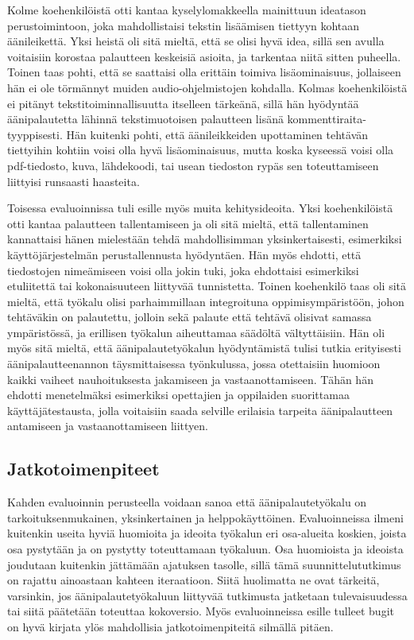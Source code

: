 \documentclass[utf8]{gradu3}
\begin{document}
Kolme koehenkilöistä otti kantaa kyselylomakkeella mainittuun ideatason perustoimintoon, joka mahdollistaisi tekstin lisäämisen tiettyyn kohtaan äänileikettä. Yksi heistä oli sitä mieltä, että se olisi hyvä idea, sillä sen avulla voitaisiin korostaa palautteen keskeisiä asioita, ja tarkentaa niitä sitten puheella. Toinen taas pohti, että se saattaisi olla erittäin toimiva lisäominaisuus, jollaiseen hän ei ole törmännyt muiden audio-ohjelmistojen kohdalla.  Kolmas koehenkilöistä ei pitänyt tekstitoiminnallisuutta itselleen tärkeänä, sillä hän hyödyntää äänipalautetta lähinnä tekstimuotoisen palautteen lisänä kommenttiraita-tyyppisesti. Hän kuitenki pohti, että äänileikkeiden upottaminen tehtävän tiettyihin kohtiin voisi olla hyvä lisäominaisuus, mutta koska kyseessä voisi olla pdf-tiedosto, kuva, lähdekoodi, tai usean tiedoston rypäs sen toteuttamiseen liittyisi runsaasti haasteita.

Toisessa evaluoinnissa tuli esille myös muita kehitysideoita. Yksi koehenkilöistä otti kantaa palautteen tallentamiseen ja oli sitä mieltä, että tallentaminen kannattaisi hänen mielestään tehdä mahdollisimman yksinkertaisesti, esimerkiksi käyttöjärjestelmän perustallennusta hyödyntäen. Hän myös ehdotti, että tiedostojen nimeämiseen voisi olla jokin tuki, joka ehdottaisi esimerkiksi etuliitettä tai kokonaisuuteen liittyvää tunnistetta. Toinen koehenkilö taas oli sitä mieltä, että työkalu olisi parhaimmillaan integroituna oppimisympäristöön, johon tehtäväkin on palautettu, jolloin sekä palaute että tehtävä olisivat samassa ympäristössä, ja erillisen työkalun aiheuttamaa säädöltä vältyttäisiin. Hän oli myös sitä mieltä, että äänipalautetyökalun hyödyntämistä tulisi tutkia erityisesti äänipalautteenannon täysmittaisessa työnkulussa, jossa otettaisiin huomioon kaikki vaiheet nauhoituksesta jakamiseen ja vastaanottamiseen. Tähän hän ehdotti menetelmäksi esimerkiksi opettajien ja oppilaiden suorittamaa käyttäjätestausta, jolla voitaisiin saada selville erilaisia tarpeita äänipalautteen antamiseen ja vastaanottamiseen liittyen.

\subsection{Jatkotoimenpiteet}

Kahden evaluoinnin perusteella voidaan sanoa että äänipalautetyökalu on tarkoituksenmukainen, yksinkertainen ja helppokäyttöinen. Evaluoinneissa ilmeni kuitenkin useita hyviä huomioita ja ideoita työkalun eri osa-alueita koskien, joista osa pystytään ja on pystytty toteuttamaan työkaluun. Osa huomioista ja ideoista joudutaan kuitenkin jättämään ajatuksen tasolle, sillä tämä suunnittelututkimus on rajattu ainoastaan kahteen iteraatioon. Siitä huolimatta ne ovat tärkeitä, varsinkin, jos äänipalautetyökaluun liittyvää tutkimusta jatketaan tulevaisuudessa tai siitä päätetään toteuttaa kokoversio. Myös evaluoinneissa esille tulleet bugit on hyvä kirjata ylös mahdollisia jatkotoimenpiteitä silmällä pitäen.
\end{document}
